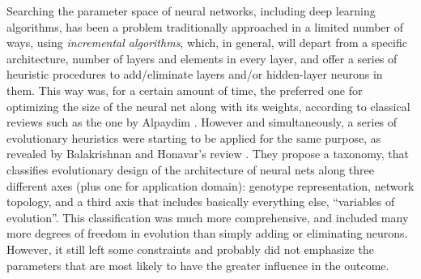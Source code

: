 \documentclass[conference]{IEEEtran}\usepackage[]{graphicx}\usepackage[]{color}
\begin{document}
Searching the parameter space of neural networks, including deep
learning algorithms, has been a problem traditionally approached
in a limited number of ways, using {\em incremental algorithms}, which, in
general, will depart from a specific architecture, number of layers
and elements in every layer, and offer a series of heuristic
procedures to add/eliminate layers and/or hidden-layer neurons in
them. This way was, for a certain amount of time, the preferred
one for optimizing the size of the neural net along with its weights, according to classical reviews such
as the one by Alpaydim \cite{Alpaydim}. However and simultaneously, a
series of evolutionary heuristics were starting to be applied for the
same purpose, as revealed by Balakrishnan and Honavar's review
\cite{balakrishnan95:EDNA}. They propose a taxonomy, that classifies evolutionary
design of the architecture of neural nets along three different axes
(plus one for application domain): genotype representation, network
topology, and a third axis that includes basically everything else,
``variables of evolution''. %
This classification was much more comprehensive, and included many more degrees of freedom in evolution than simply adding or eliminating neurons. However, it still left some constraints and probably did not emphasize the parameters that are most likely to have the greater influence in the outcome.
\end{document}

